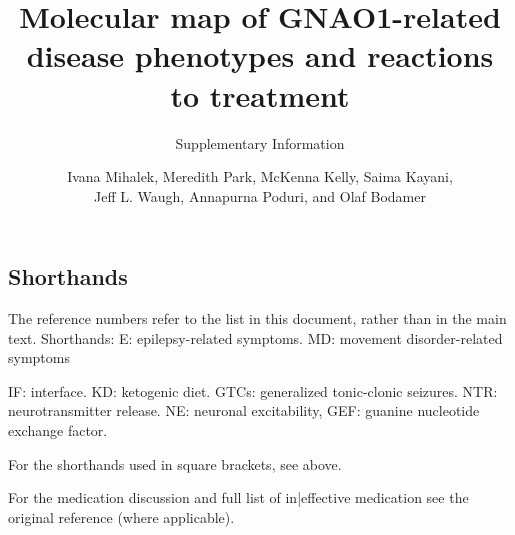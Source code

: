 \documentclass[11pt]{scrartcl}
\title{Molecular map of GNAO1-related disease phenotypes and reactions to treatment}
\subtitle{Supplementary Information}
\author{Ivana Mihalek, Meredith Park, McKenna Kelly, Saima Kayani, \\ Jeff L. Waugh, Annapurna Poduri, and Olaf Bodamer}
\begin{document}
\maketitle


\clearpage
\subsection{Shorthands}

 The reference numbers refer to the list in this document, rather than in the main text. Shorthands:
E: epilepsy-related symptoms. MD: movement disorder-related symptoms

IF: interface. KD: ketogenic diet.  GTCs: generalized tonic-clonic seizures. NTR: neurotransmitter release.  NE: neuronal excitability, GEF: guanine nucleotide exchange factor.

For the shorthands used in square brackets, see above.

For the medication discussion and full list of in|effective medication see the original reference (where applicable).
\clearpage
\end{document}
